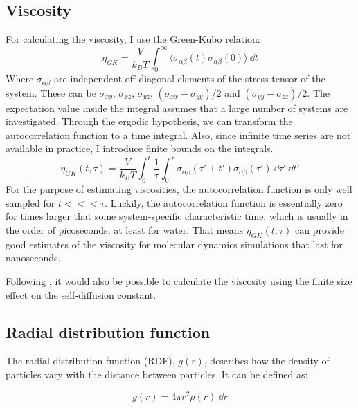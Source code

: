 \subsection{Viscosity}
For calculating the viscosity, I use the Green-Kubo relation:
\begin{equation}
	\eta_{GK} = \frac{V}{k_B T} \int_0^\infty \langle \sigma_{\alpha\beta}(t) \sigma_{\alpha\beta}(0) \rangle\ \dd t
	\label{eq:GK_shear_viscosity}
\end{equation}
Where $\sigma_{\alpha\beta}$ are independent off-diagonal elements of the stress tensor of the system. These can be $\sigma_{xy}$, $\sigma_{xz}$, $\sigma_{yz}$, $(\sigma_{xx}-\sigma_{yy})/2$ and $(\sigma_{yy}-\sigma_{zz})/2$. The expectation value inside the integral assumes that a large number of systems are investigated. Through the ergodic hypothesis, we can transform the autocorrelation function to a time integral. Also, since infinite time series are not available in practice, I introduce finite bounds on the integrals. 
\begin{equation}
	\eta_{GK}(t, \tau) = \frac{V}{k_B T} \int_0^t  \frac{1}{\tau} \int_0^\tau \sigma_{\alpha\beta}(\tau'+t') \sigma_{\alpha\beta}(\tau')\ \dd \tau'\ \dd t' 
\label{eq:GK_shear_viscosity_estimate}
\end{equation}
For the purpose of estimating viscosities, the autocorrelation function is only well sampled for $t <<< \tau$. Luckily, the autocorrelation function is essentially zero for times larger that some system-specific characteristic time, which is usually in the order of picoseconds, at least for water. That means $\eta_{GK}(t, \tau)$ can provide good estimates of the viscosity for molecular dynamics simulations that last for nanoseconds.


Following \cite{Yeh2004}, it would also be possible to calculate the viscosity using the finite size effect on the self-diffusion constant.

\subsection{Radial distribution function}
The radial distribution function (RDF), $g(r)$, describes how the density of particles vary with the distance between particles. It can be defined as:

\begin{equation}
	g(r) = 4\pi r^2 \rho(r) \ \dd r
\end{equation}

